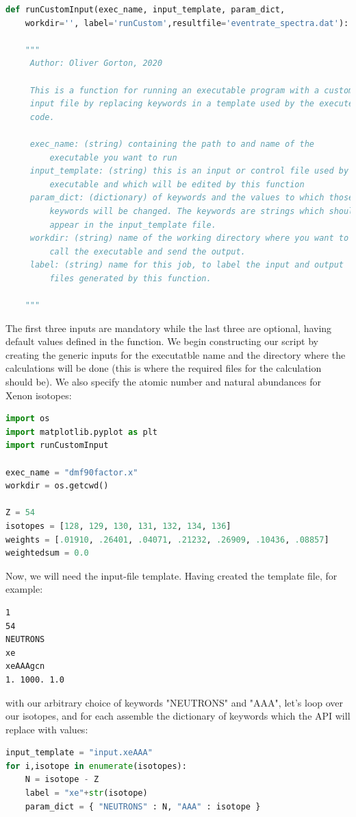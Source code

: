 \documentclass[11pt]{article}
\begin{document}
\begin{lstlisting}[language=python]
def runCustomInput(exec_name, input_template, param_dict,
    workdir='', label='runCustom',resultfile='eventrate_spectra.dat'):

    """
     Author: Oliver Gorton, 2020

     This is a function for running an executable program with a custom
     input file by replacing keywords in a template used by the executed
     code.

     exec_name: (string) containing the path to and name of the
         executable you want to run
     input_template: (string) this is an input or control file used by the 
         executable and which will be edited by this function
     param_dict: (dictionary) of keywords and the values to which those 
         keywords will be changed. The keywords are strings which should 
         appear in the input_template file. 
     workdir: (string) name of the working directory where you want to 
         call the executable and send the output.
     label: (string) name for this job, to label the input and output 
         files generated by this function.

    """
\end{lstlisting}
The first three inputs are mandatory while the last three are optional, having
default values defined in the function.
We begin constructing our script by creating the generic inputs for the
executatble name and the directory where the calculations will be done (this is
where the required files for the calculation should be). We also specify the 
atomic number and natural abundances for Xenon isotopes:
\begin{lstlisting}[language=python]
import os
import matplotlib.pyplot as plt
import runCustomInput

exec_name = "dmf90factor.x"
workdir = os.getcwd()

Z = 54
isotopes = [128, 129, 130, 131, 132, 134, 136]
weights = [.01910, .26401, .04071, .21232, .26909, .10436, .08857]
weightedsum = 0.0
\end{lstlisting}
Now, we will need the input-file template. Having created the template file, for
example:
\begin{verbatim}
1
54
NEUTRONS
xe
xeAAAgcn
1. 1000. 1.0
\end{verbatim}
with our arbitrary choice of keywords "NEUTRONS" and "AAA", 
let's loop over our isotopes, and for each assemble the dictionary of
keywords which the API will replace with values:
\begin{lstlisting}[language=python]
input_template = "input.xeAAA"
for i,isotope in enumerate(isotopes):
    N = isotope - Z
    label = "xe"+str(isotope)
    param_dict = { "NEUTRONS" : N, "AAA" : isotope }
\end{lstlisting}
\end{document}
